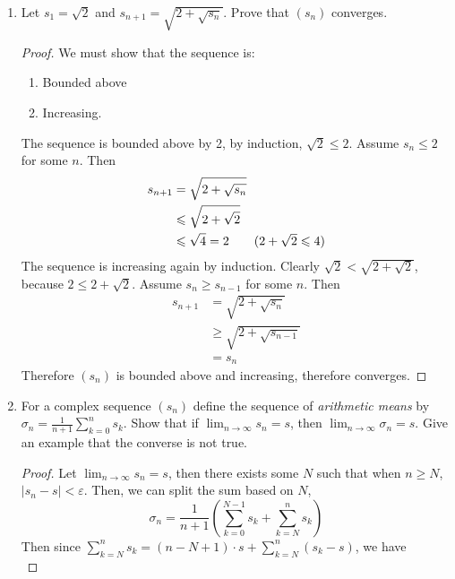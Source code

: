 \documentclass[hidelinks,12pt]{article}
\title{\scalebox{1.5}{Math 723 Final Exam}}
\author{\scalebox{1.5}{Theo Koss}}
\date{December 2024}
\renewcommand{\geq}{\geqslant}
\renewcommand{\leq}{\leqslant}
\begin{document}
\maketitle
\begin{enumerate}
    \item Let  \(s_{1}=\sqrt{2}\) and \(s_{n+1}=\sqrt{2+\sqrt{s_{n}}}\). Prove that \((s_{n})\) converges.
        \begin{proof}
        We must show that the sequence is:
        \begin{enumerate}
            \item Bounded above
            \item Increasing.
        \end{enumerate}
        The sequence is bounded above by 2, by induction, \(\sqrt{2}\leq2\). Assume \(s_{n}\leq2\) for some \(n\). Then
        \begin{align*}
            s_{n+1}&=\sqrt{2+\sqrt{s_{n}}}\\
                   &\leq\sqrt{2+\sqrt{2}}\\
                   &\leq\sqrt{4}=2\tag{\(2+\sqrt{2}\leq4\)}
        \end{align*}
        The sequence is increasing again by induction. Clearly \(\sqrt{2}<\sqrt{2+\sqrt{2}}\), because \(2\leq2+\sqrt{2}\). Assume \(s_{n}\geq s_{n-1}\) for some \(n\). Then \begin{align*}
            s_{n+1}&=\sqrt{2+\sqrt{s_{n}}}\\
                   &\geq\sqrt{2+\sqrt{s_{n-1}}}\tag{Assumption}\\
                   &=s_{n}
        \end{align*}
        Therefore \((s_{n})\) is bounded above and increasing, therefore converges.
        \end{proof}
    \item For a complex sequence \((s_{n})\) define the sequence of \emph{arithmetic means} by \(\sigma_{n}=\frac{1}{n+1}\sum_{k=0}^{n}s_{k}\). Show that if \(\lim_{n\to\infty}s_{n}=s\), then \(\lim_{n\to\infty}\sigma_{n}=s\). Give an example that the converse is not true.
        \begin{proof}
        Let \(\lim_{n\to\infty}s_{n}=s\), then there exists some \(N\) such that when \(n\geq N\), \(|s_{n}-s|<\varepsilon\). Then, we can split the sum based on \(N\), \[
        \sigma_{n}=\frac{1}{n+1}\left(\sum_{k=0}^{N-1}s_{k}+\sum_{k=N}^{n}s_{k}\right)
        \]
       Then since \(\sum_{k=N}^{n}s_{k}=(n-N+1)\cdot s+\sum_{k=N}^{n}(s_{k}-s)\), we have\[
\]
\end{proof}
\end{enumerate}
\end{document}
